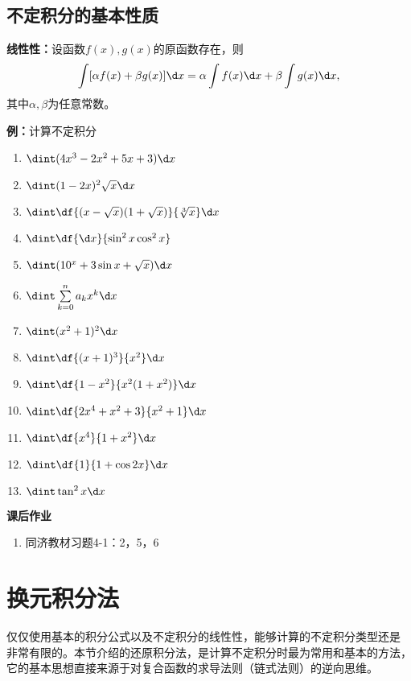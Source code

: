 \subsection{不定积分的基本性质}

\begin{thx}
	{\bf 线性性：}设函数$f(x),g(x)$的原函数存在，则
	$$\int[\alpha f(x)+\beta g(x)]\d x
	=\alpha\int f(x)\d x+\beta\int g(x)\d x,$$
	其中$\alpha,\beta$为任意常数。
\end{thx}

{\bf 例：}计算不定积分
\begin{enumerate}[(1)]
  \setlength{\itemindent}{1cm}
  \item $\dint (4x^3-2x^2+5x+3)\d x$
  \item $\dint(1-2x)^2\sqrt x\d x$
  \item $\dint\df{(x-\sqrt x)(1+\sqrt x)}{\sqrt[3]x}\d x$
  \item $\dint\df{\d x}{\sin^2x\cos^2x}$
  \item $\dint(10^x+3\sin x+\sqrt x)\d x$
  \item $\dint\sum\limits_{k=0}^na_kx^k\d x$
  \item $\dint (x^2+1)^2\d x$ 
  \item $\dint\df{(x+1)^3}{x^2}\d x$ 
  \item $\dint\df{1-x^2}{x^2(1+x^2)}\d x$
  \item $\dint\df{2x^4+x^2+3}{x^2+1}\d x$
  \item $\dint \df{x^4}{1+x^2}\d x$ 
  \item $\dint\df{1}{1+\cos 2x}\d x$ 
  \item $\dint\tan^2 x\d x$
\end{enumerate}

\begin{ext}
	{\bf 课后作业}
	\begin{enumerate}
	  \item 同济教材习题4-1：2，5，6
	\end{enumerate}
\end{ext}

\section{换元积分法}

仅仅使用基本的积分公式以及不定积分的线性性，能够计算的不定积分类型还是
非常有限的。本节介绍的还原积分法，是计算不定积分时最为常用和基本的方法，
它的基本思想直接来源于对复合函数的求导法则（链式法则）的逆向思维。

